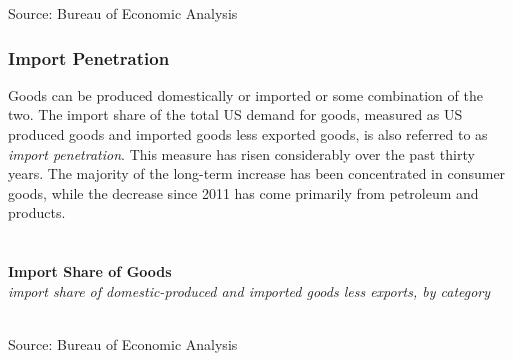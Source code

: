 \documentclass{report}
\makeatletter
\newcommand{\tbllink}[1]{\href{https://raw.githubusercontent.com/bdecon/US-chartbook/master/chartbook/data/#1}{\faTable}}
\newcommand*\short[1]{\expandafter\@gobbletwo\number\numexpr#1\relax}
\newcommand{\sbar}[4]{
		\addplot[ybar stacked, bar width=2.6pt, draw opacity=0, fill=#1] 
			table [x=#2, y=#3, col sep=comma]{#4};}
\newcommand{\dateaxisticks}{
		date coordinates in=x, axis line style={draw=none},
		xmax={2020-05-10},
		max space between ticks=40,	    
		xtick={{1990-01-01}, {1992-01-01}, {1994-01-01}, 
			{1996-01-01}, {1998-01-01}, {2000-01-01}, 
			{2002-01-01}, {2004-01-01}, {2006-01-01},
			{2008-01-01}, {2010-01-01}, {2012-01-01}, {2014-01-01},
		    {2016-01-01}, {2018-01-01}, {2020-01-01}},
		minor xtick={{1989-01-01}, {1991-01-01}, {1993-01-01},
			{1995-01-01}, {1997-01-01}, {1999-01-01}, 
			{2001-01-01}, {2003-01-01}, {2005-01-01}, {2007-01-01},
		    {2009-01-01}, {2011-01-01}, {2013-01-01}, {2015-01-01},
		    {2017-01-01}, {2019-01-01}},
		enlarge y limits={0.06}, enlarge x limits={0.01},
		}
\newcommand{\bbar}[2]{extra #1 ticks = {{#2}}, extra #1 tick labels = ,
		extra #1 tick style = {grid=major, grid style={thick, black!25}},}
\newcommand{\rbars}{
		\fill[color=black!10] (axis cs:{1990-07-01},\pgfkeysvalueof{/pgfplots/ymin}) rectangle 
			(axis cs:{1991-03-01}, \pgfkeysvalueof{/pgfplots/ymax});
		\fill[color=black!10] (axis cs:{2007-12-01},\pgfkeysvalueof{/pgfplots/ymin}) rectangle 
			(axis cs:{2009-07-01}, \pgfkeysvalueof{/pgfplots/ymax});
		\fill[color=black!10] (axis cs:{2001-03-01},\pgfkeysvalueof{/pgfplots/ymin}) rectangle 
			(axis cs:{2001-11-01}, \pgfkeysvalueof{/pgfplots/ymax});}
\makeatother
\begin{document}
{{{{{{{{\vspace{-2mm}
\footnotesize{Source: Bureau of Economic Analysis}}



\newpage

\subsubsection*{\color{black!70} \seriffont Import Penetration}

\begin{minipage}{0.76\textwidth}

\small Goods can be produced domestically or imported or some combination of the two. The import share of the total US demand for goods, measured as US produced goods and imported goods less exported goods, is also referred to as \textit{import penetration}. This measure has risen considerably over the past thirty years. The majority of the long-term increase has been concentrated in consumer goods, while the decrease since 2011 has come primarily from petroleum and products. \\

 \\

 \\

\noindent \normalsize \textbf{Import Share of Goods}\\
\footnotesize{\textit{import share of domestic-produced and imported goods less exports, by category}}\\
\noindent \hspace*{-2mm} \\
\footnotesize{Source: Bureau of Economic Analysis} \hfill \tbllink{goodsimpsh.csv}

\end{minipage}

\newpage

}}}}}}}
\end{document}
